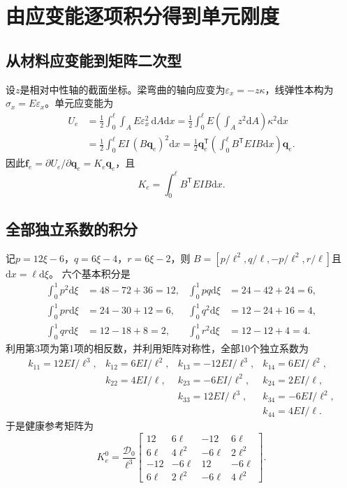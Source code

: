 \documentclass[UTF8,a4paper,11pt,fontset=fandol]{ctexart}
\numberwithin{equation}{section}
\newcommand{\dd}{\mathrm d}
\newcommand{\T}{^{\mathsf T}}
\newcommand{\EI}{\mathcal D}
\begin{document}
\newpage
\section{由应变能逐项积分得到单元刚度}
\subsection{从材料应变能到矩阵二次型}
设$z$是相对中性轴的截面坐标。梁弯曲的轴向应变为$\varepsilon_x=-z\kappa$，线弹性本构为$\sigma_x=E\varepsilon_x$。单元应变能为
\begin{align}
U_e&=\frac12\int_0^\ell\int_A E\varepsilon_x^2\,\dd A\dd x
=\frac12\int_0^\ell E\left(\int_A z^2\dd A\right)\kappa^2\dd x\\
&=\frac12\int_0^\ell EI\,(B\bm q_e)^2\dd x
=\frac12\bm q_e\T\left(\int_0^\ell B\T EI B\dd x\right)\bm q_e.
\end{align}
因此$\bm f_e=\partial U_e/\partial\bm q_e=K_e\bm q_e$，且
\begin{equation}\boxed{K_e=\int_0^\ell B\T EI B\dd x.}\end{equation}
\subsection{全部独立系数的积分}
记$p=12\xi-6$，$q=6\xi-4$，$r=6\xi-2$，则
$B=[p/\ell^2,q/\ell,-p/\ell^2,r/\ell]$且$\dd x=\ell\dd\xi$。
六个基本积分是
\begin{align}
\int_0^1p^2\dd\xi&=48-72+36=12, &
\int_0^1pq\dd\xi&=24-42+24=6,\\
\int_0^1pr\dd\xi&=24-30+12=6, &
\int_0^1q^2\dd\xi&=12-24+16=4,\\
\int_0^1qr\dd\xi&=12-18+8=2, &
\int_0^1r^2\dd\xi&=12-12+4=4.
\end{align}
利用第3项为第1项的相反数，并利用矩阵对称性，全部10个独立系数为
\begin{equation}
\begin{array}{llll}
k_{11}=12EI/\ell^3,&k_{12}=6EI/\ell^2,&k_{13}=-12EI/\ell^3,&k_{14}=6EI/\ell^2,\\
&k_{22}=4EI/\ell,&k_{23}=-6EI/\ell^2,&k_{24}=2EI/\ell,\\
&&k_{33}=12EI/\ell^3,&k_{34}=-6EI/\ell^2,\\
&&&k_{44}=4EI/\ell.
\end{array}
\end{equation}
于是健康参考矩阵为
\begin{equation}\boxed{
K_e^0=\frac{\EI_0}{\ell^3}
\begin{bmatrix}
12&6\ell&-12&6\ell\\
6\ell&4\ell^2&-6\ell&2\ell^2\\
-12&-6\ell&12&-6\ell\\
6\ell&2\ell^2&-6\ell&4\ell^2
\end{bmatrix}.}\label{eq:ke}
\end{equation}
\end{document}

